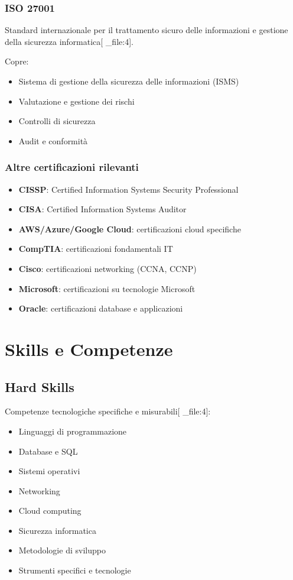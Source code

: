 \documentclass[12pt,a4paper]{article}
\begin{document}
\subsubsection{ISO 27001}
Standard internazionale per il trattamento sicuro delle informazioni e gestione della sicurezza informatica[ _file:4].

Copre:
\begin{itemize}
    \item Sistema di gestione della sicurezza delle informazioni (ISMS)
    \item Valutazione e gestione dei rischi
    \item Controlli di sicurezza
    \item Audit e conformità
\end{itemize}

\subsubsection{Altre certificazioni rilevanti}
\begin{itemize}
    \item \textbf{CISSP}: Certified Information Systems Security Professional
    \item \textbf{CISA}: Certified Information Systems Auditor
    \item \textbf{AWS/Azure/Google Cloud}: certificazioni cloud specifiche
    \item \textbf{CompTIA}: certificazioni fondamentali IT
    \item \textbf{Cisco}: certificazioni networking (CCNA, CCNP)
    \item \textbf{Microsoft}: certificazioni su tecnologie Microsoft
    \item \textbf{Oracle}: certificazioni database e applicazioni
\end{itemize}

\section{Skills e Competenze}

\subsection{Hard Skills}
Competenze tecnologiche specifiche e misurabili[ _file:4]:
\begin{itemize}
    \item Linguaggi di programmazione
    \item Database e SQL
    \item Sistemi operativi
    \item Networking
    \item Cloud computing
    \item Sicurezza informatica
    \item Metodologie di sviluppo
    \item Strumenti specifici e tecnologie
\end{itemize}
\end{document}
